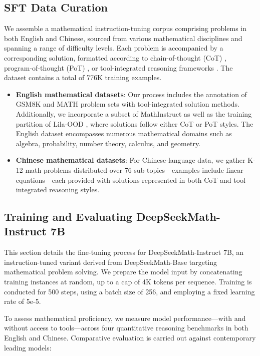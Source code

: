 \subsection{SFT Data Curation}

We assemble a mathematical instruction-tuning corpus comprising problems in both English and Chinese, sourced from various mathematical disciplines and spanning a range of difficulty levels. Each problem is accompanied by a corresponding solution, formatted according to chain-of-thought (CoT) \citep{cot}, program-of-thought (PoT) \citep{pot,pal}, or tool-integrated reasoning frameworks \citep{tora}. The dataset contains a total of 776K training examples.

\begin{itemize}[topsep=0pt]
    \item \textbf{English mathematical datasets}: Our process includes the annotation of GSM8K and MATH problem sets with tool-integrated solution methods. Additionally, we incorporate a subset of MathInstruct \citep{MathInstruct} as well as the training partition of Lila-OOD \citep{lila}, where solutions follow either CoT or PoT styles. The English dataset encompasses numerous mathematical domains such as algebra, probability, number theory, calculus, and geometry.
    \item \textbf{Chinese mathematical datasets}: For Chinese-language data, we gather K-12 math problems distributed over 76 sub-topics—examples include linear equations—each provided with solutions represented in both CoT and tool-integrated reasoning styles.
\end{itemize}

\subsection{Training and Evaluating DeepSeekMath-Instruct 7B}

This section details the fine-tuning process for DeepSeekMath-Instruct 7B, an instruction-tuned variant derived from DeepSeekMath-Base targeting mathematical problem solving. We prepare the model input by concatenating training instances at random, up to a cap of 4K tokens per sequence. Training is conducted for 500 steps, using a batch size of 256, and employing a fixed learning rate of 5e-5.

To assess mathematical proficiency, we measure model performance—with and without access to tools—across four quantitative reasoning benchmarks in both English and Chinese. Comparative evaluation is carried out against contemporary leading models:

